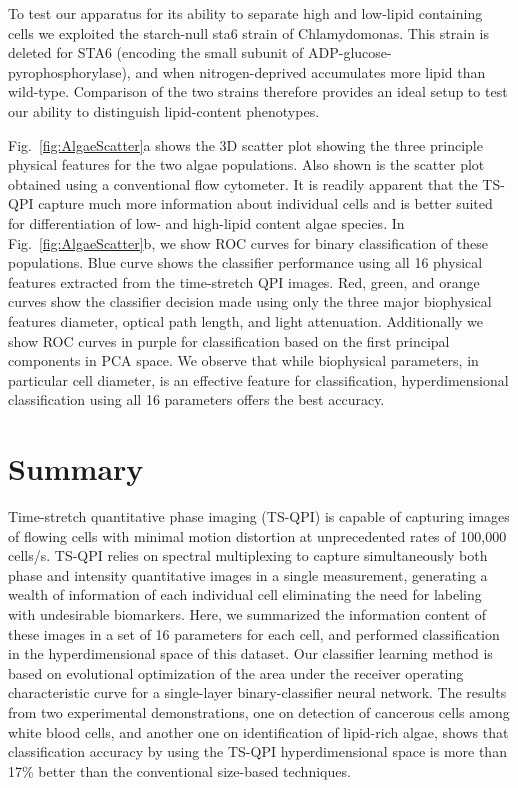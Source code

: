 \documentclass[aps,pra,reprint,superscriptaddress]{revtex4-1}
\begin{document}
To test our apparatus for its ability to separate high and low-lipid containing cells we exploited the starch-null sta6 strain of Chlamydomonas. This strain is deleted for STA6 (encoding the small subunit of ADP-glucose-pyrophosphorylase), and when nitrogen-deprived accumulates more lipid than wild-type. Comparison of the two strains therefore provides an ideal setup to test our ability to distinguish lipid-content phenotypes.

Fig.~\ref{fig:AlgaeScatter}a shows the 3D scatter plot showing the three principle physical features for the two algae populations. Also shown is the scatter plot obtained using a conventional flow cytometer. It is readily apparent that the TS-QPI capture much more information about individual cells and is better suited for differentiation of low- and high-lipid content algae species. In Fig.~\ref{fig:AlgaeScatter}b, we show ROC curves for binary classification of these populations. Blue curve shows the classifier performance using all 16 physical features extracted from the time-stretch QPI images. Red, green, and orange curves show the classifier decision made using only the three major biophysical features diameter, optical path length, and light attenuation. Additionally we show ROC curves in purple for classification based on the first principal components in PCA space. We observe that while biophysical parameters, in particular cell diameter, is an effective feature for classification, hyperdimensional classification using all 16 parameters offers the best accuracy. 


\section{Summary}

Time-stretch quantitative phase imaging (TS-QPI) is capable of capturing images of flowing cells with minimal motion distortion at unprecedented rates of 100,000 cells/s. TS-QPI relies on spectral multiplexing to capture simultaneously both phase and intensity quantitative images in a single measurement, generating a wealth of information of each individual cell eliminating the need for labeling with undesirable biomarkers. Here, we summarized the information content of these images in a set of 16 parameters for each cell, and performed classification in the hyperdimensional space of this dataset. Our classifier learning method is based on evolutional optimization of the area under the receiver operating characteristic curve for a single-layer binary-classifier neural network. The results from two experimental demonstrations, one on detection of cancerous cells among white blood cells, and another one on identification of lipid-rich algae, shows that classification accuracy by using the TS-QPI hyperdimensional space is more than 17\% better than the conventional size-based techniques.
\end{document}
